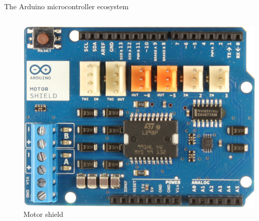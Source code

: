\documentclass[compress]{beamer}
\begin{document}
\begin{frame}{The Arduino microcontroller ecosystem}
\begin{columns}
\begin{column}{0.3\linewidth}
        \end{column}
        \begin{column}{0.3\linewidth}
            \begin{center}
            \includegraphics[width=\linewidth]{motor-shield}\\
            Motor shield
            \end{center}

        \end{column}
    \end{columns}

    \vspace{0.5em}


\end{frame}
\end{document}
